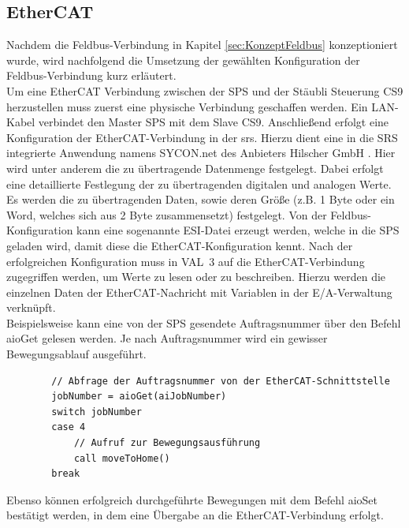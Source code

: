 \documentclass[ a4paper,
                oneside,
                toc=bibliography,
                toc=listof
                ]{scrbook}
\begin{document}
	\subsection{EtherCAT}
	Nachdem die Feldbus-Verbindung in Kapitel \ref{sec:KonzeptFeldbus} konzeptioniert wurde, wird nachfolgend die Umsetzung der gewählten Konfiguration der Feldbus-Verbindung kurz erläutert.\\
	Um eine EtherCAT Verbindung zwischen der SPS und der Stäubli Steuerung CS9 herzustellen muss zuerst eine physische Verbindung geschaffen werden. Ein LAN-Kabel verbindet den Master SPS mit dem Slave CS9. Anschließend erfolgt eine Konfiguration der EtherCAT-Verbindung in der \acl{srs}. Hierzu dient eine in die SRS integrierte Anwendung namens \glqq SYCON.net \grqq{} des Anbieters \glqq Hilscher GmbH \grqq. Hier wird unter anderem die zu übertragende Datenmenge festgelegt. Dabei erfolgt eine detaillierte Festlegung der zu übertragenden digitalen und analogen Werte. Es werden die zu übertragenden Daten, sowie deren Größe (z.B. 1 Byte oder ein Word, welches sich aus 2 Byte zusammensetzt) festgelegt. Von der Feldbus-Konfiguration kann eine sogenannte ESI-Datei erzeugt werden, welche in die SPS geladen wird, damit diese die EtherCAT-Konfiguration kennt. Nach der erfolgreichen Konfiguration muss in VAL~3 auf die EtherCAT-Verbindung zugegriffen werden, um Werte zu lesen oder zu beschreiben. Hierzu werden die einzelnen Daten der EtherCAT-Nachricht mit Variablen in der E/A-Verwaltung verknüpft. \cite{CS9} \cite{CS9_Fieldbus}\\
	Beispielsweise kann eine von der SPS gesendete Auftragsnummer über den Befehl \glqq aioGet\grqq{} gelesen werden. Je nach Auftragsnummer wird ein gewisser Bewegungsablauf ausgeführt.
	\begin{lstlisting}
		// Abfrage der Auftragsnummer von der EtherCAT-Schnittstelle
		jobNumber = aioGet(aiJobNumber)
		switch jobNumber
		case 4
			// Aufruf zur Bewegungsausführung
			call moveToHome()
		break
	\end{lstlisting}
	Ebenso können erfolgreich durchgeführte Bewegungen mit dem Befehl \glqq aioSet\grqq{} bestätigt werden, in dem eine Übergabe an die EtherCAT-Verbindung erfolgt. \cite{VAL3} 
	
\end{document}
